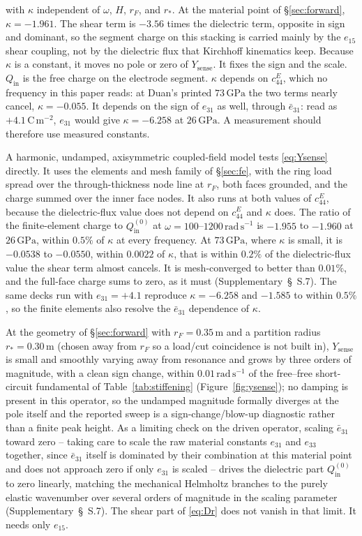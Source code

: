 \documentclass[11pt]{article}
\newcommand{\eebar}{\bar{e}_{31}}
\begin{document}
with $\kappa$ independent of $\omega$, $H$, $r_F$, and $r_*$. At the
material point of \S\ref{sec:forward}, $\kappa=-1.961$. The shear term is
$-3.56$ times the dielectric term, opposite in sign and dominant, so the
segment charge on this stacking is carried mainly by the $e_{15}$ shear
coupling, not by the dielectric flux that Kirchhoff kinematics keep.
Because $\kappa$ is a constant, it moves no pole or zero of
$Y_{\mathrm{sense}}$. It fixes the sign and the scale. $Q_{\mathrm{in}}$ is
the free charge on the electrode segment. $\kappa$ depends on
$c_{44}^E$, which no frequency in this paper reads: at Duan's printed
$73\,\mathrm{GPa}$ the two terms nearly cancel, $\kappa=-0.055$. It
depends on the sign of $e_{31}$ as well, through $\eebar$: read as
$+4.1\,\mathrm{C\,m^{-2}}$, $e_{31}$ would give $\kappa=-6.258$ at
$26\,\mathrm{GPa}$. A measurement should therefore use measured
constants.

A harmonic, undamped, axisymmetric coupled-field model tests
\eqref{eq:Ysense} directly. It uses the elements and mesh family of
\S\ref{sec:fe}, with the ring load spread over the through-thickness
node line at $r_F$, both faces grounded, and the charge summed over the
inner face nodes. It also runs at both values of $c_{44}^E$, because the
dielectric-flux value does not depend on $c_{44}^E$ and $\kappa$ does.
The ratio of the finite-element charge to $Q_{\mathrm{in}}^{(0)}$ at
$\omega=100$--$1200\,\mathrm{rad\,s^{-1}}$ is $-1.955$ to $-1.960$ at
$26\,\mathrm{GPa}$, within $0.5\%$ of $\kappa$ at every frequency. At
$73\,\mathrm{GPa}$, where $\kappa$ is small, it is $-0.0538$ to
$-0.0550$, within $0.0022$ of $\kappa$, that is within $0.2\%$ of the
dielectric-flux value the shear term almost cancels. It is
mesh-converged to better than $0.01\%$, and the full-face charge sums to
zero, as it must (Supplementary~\S~S.7). The same decks run with
$e_{31}=+4.1$ reproduce $\kappa=-6.258$ and $-1.585$ to within $0.5\%$,
so the finite elements also resolve the $\eebar$ dependence of $\kappa$.

At the geometry of \S\ref{sec:forward} with $r_F=0.35\,\mathrm{m}$ and a
partition radius $r_*=0.30\,\mathrm{m}$ (chosen away from $r_F$ so a
load/cut coincidence is not built in), $Y_{\mathrm{sense}}$ is small and
smoothly varying away from resonance and grows by three orders of
magnitude, with a clean sign change, within $0.01\,\mathrm{rad\,s^{-1}}$
of the free--free short-circuit fundamental of Table~\ref{tab:stiffening}
(Figure~\ref{fig:ysense}); no damping is present in this operator, so the
undamped magnitude formally diverges at the pole itself and the reported
sweep is a sign-change/blow-up diagnostic rather than a finite peak
height. As a limiting check on the driven operator, scaling $\eebar$
toward zero -- taking care to scale the raw material constants $e_{31}$
and $e_{33}$ together, since $\eebar$ itself is dominated by their
combination at this material point and does not approach zero if only
$e_{31}$ is scaled -- drives the dielectric part $Q_{\mathrm{in}}^{(0)}$
to zero linearly, matching the mechanical Helmholtz branches to the
purely elastic wavenumber over several orders of magnitude in the
scaling parameter (Supplementary~\S~S.7). The shear part of
\eqref{eq:Dr} does not vanish in that limit. It needs only $e_{15}$.
\end{document}
